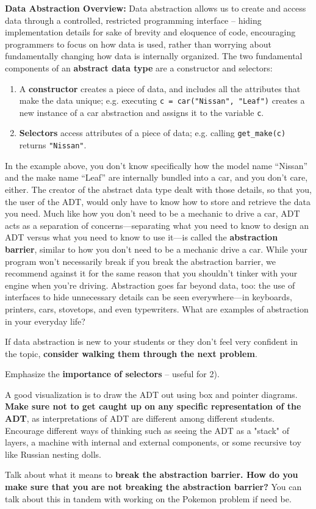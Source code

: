 \textbf{Data Abstraction Overview:}
Data abstraction allows us to create and access data through a controlled, restricted programming interface -- hiding implementation details for sake of brevity and eloquence of code, encouraging programmers to focus on how data is used, rather than worrying about fundamentally changing how data is internally organized. The two fundamental components of an \textbf{abstract data type} are a constructor and selectors:
\begin{enumerate}
	\item A \textbf{constructor} creates a piece of data, and includes all the attributes that make the data unique; e.g. executing \texttt{c = car("Nissan", "Leaf")} creates a new instance of a car abstraction and assigns it to the variable \lstinline{c}.
	\item \textbf{Selectors} access attributes of a piece of data; e.g. calling \lstinline{get_make(c)} returns \lstinline{"Nissan"}.
\end{enumerate}

In the example above, you don't know specifically how the model name ``Nissan'' and the make name ``Leaf'' are internally bundled into a car, and you don't care, either. The creator of the abstract data type dealt with those details, so that you, the user of the ADT, would only have to know how to store and retrieve the data you need. Much like how you don't need to be a mechanic to drive a car, ADT acts as a separation of concerns---separating what you need to know to design an ADT versus what you need to know to use it---is called the \textbf{abstraction barrier}, similar to how you don't need to be a mechanic drive a car. While your program won't necessarily break if you break the abstraction barrier, we recommend against it for the same reason that you shouldn't tinker with your engine when you're driving. Abstraction goes far beyond data, too: the use of interfaces to hide unnecessary details can be seen everywhere---in keyboards, printers, cars, stovetops, and even typewriters. What are examples of abstraction in your everyday life? 

\begin{meta}
If data abstraction is new to your students or they don't feel very confident in the topic, \textbf{consider walking them through the next problem}.

Emphasize the \textbf{importance of selectors} -- useful for 2).

A good visualization is to draw the ADT out using box and pointer diagrams. \textbf{Make sure not to get caught up on any specific representation of the ADT}, as interpretations of ADT are different among different students. Encourage different ways of thinking such as seeing the ADT as a "stack" of layers, a machine with internal and external components, or some recursive toy like Russian nesting dolls.

Talk about what it means to \textbf{break the abstraction barrier. How do you make sure that you are not breaking the abstraction barrier?} You can talk about this in tandem with working on the Pokemon problem if need be.
\end{meta}
